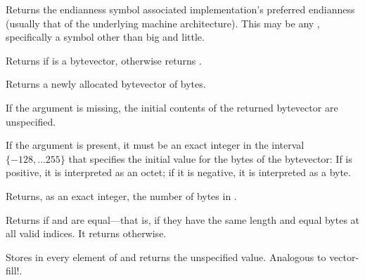 \begin{entry}{%
}

Returns the endianness symbol associated implementation's preferred
endianness (usually that of the underlying machine architecture).
This may be any , specifically a symbol other
than {\cf big} and {\cf little}.
\end{entry}   

\begin{entry}{%
}
   
Returns \schtrue{} if  is a bytevector,
otherwise returns \schfalse{}.
\end{entry}

\begin{entry}{%
}
   
Returns a newly allocated bytevector of  bytes.
   
If the  argument is missing, the initial contents of the
returned bytevector are unspecified.
   
If the  argument is present, it must be an exact integer in
the interval $\{-128, \ldots 255\}$ that specifies the initial value
for the bytes of the bytevector: If  is positive, it is
interpreted as an octet; if it is negative, it is interpreted as a byte.
\end{entry}   

\begin{entry}{%
}
   
Returns, as an exact integer, the number of bytes in .
\end{entry}

\begin{entry}{%
}
   
Returns \schtrue{} if  and  are equal---that
is, if they have the same length and equal bytes at all valid indices.
It returns \schfalse{} otherwise.
\end{entry}

\begin{entry}{%
}

Stores  in every element of 
and returns the unspecified value.  Analogous to {\cf vector-fill!}.
\end{entry}

